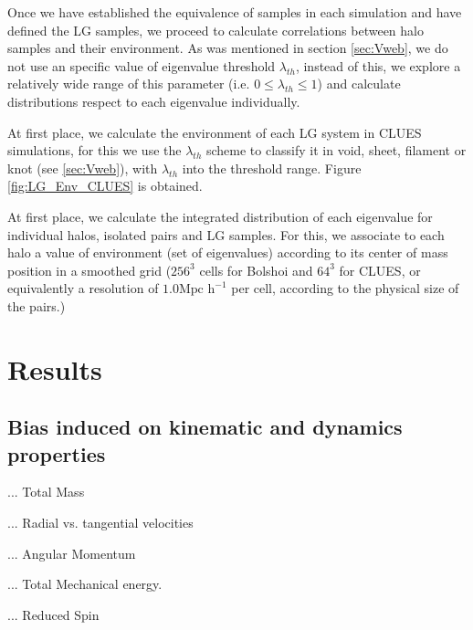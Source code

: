 \documentclass[usenatbib]{latex/mn2e}
\begin{document}
Once we have established the equivalence of samples in each simulation and 
have defined the LG samples, we proceed to calculate correlations between 
halo samples and their environment. As was mentioned in section 
\ref{sec:Vweb}, we do not use an specific value of eigenvalue threshold 
$\lambda_{th}$, instead of this, we explore a relatively wide range of 
this parameter (i.e. $0 \leq \lambda_{th} \leq 1$) and calculate 
distributions respect to each eigenvalue individually.



At first place, we calculate the environment of each LG system in CLUES 
simulations, for this we use the $\lambda_{th}$ scheme to classify it in 
void, sheet, filament or knot (see \ref{sec:Vweb}), with $\lambda_{th}$
into the threshold range. Figure \ref{fig:LG_Env_CLUES} is obtained.



At first place, we calculate the integrated distribution of each 
eigenvalue for individual halos, isolated pairs and LG samples. For this, 
we associate to each halo a value of environment (set of eigenvalues)
according to its center of mass position in a smoothed grid ($256^3$ 
cells for Bolshoi and $64^3$ for CLUES, or equivalently a resolution of 
$1.0 \mbox{Mpc h}^{-1} $ per cell, according to the physical size of the 
pairs.)



\section{Results}
\label{sec:Results}

\subsection{Bias induced on kinematic and dynamics properties}
\label{subsec:bias_kinematic}

... Total Mass

... Radial vs. tangential velocities

... Angular Momentum

... Total Mechanical energy.

... Reduced Spin
\end{document}
